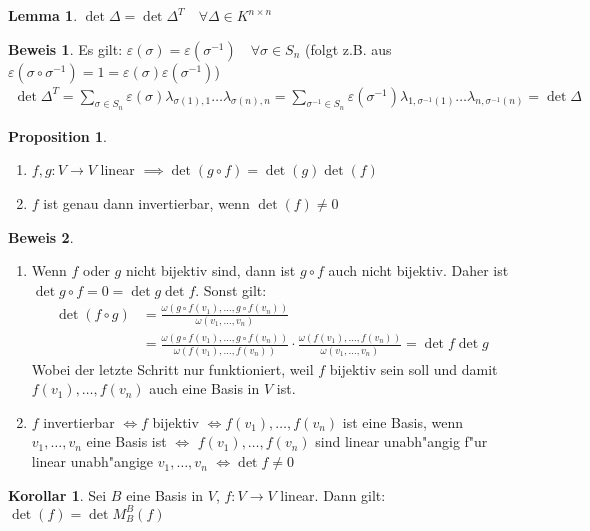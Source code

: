 \documentclass[oneside,fontsize=11pt,paper=a4,BCOR=0mm,DIV=12,automark,headsepline]{scrbook}
\theoremstyle{remark}
\theoremstyle{definition}
\newtheorem*{proposition}{Proposition}
\newtheorem{lemma}{Lemma}[section]
\newtheorem*{korollar}{Korollar}
\theoremstyle{definition}
\newtheorem*{prof}{Beweis}
\theoremstyle{remark}
\begin{document}
\begin{lemma}
	\(\det\Delta = \det\Delta^T\quad\forall \Delta\in K^{n\times n}\)
\end{lemma}
\begin{prof}
	Es gilt: \(\varepsilon(\sigma) = \varepsilon(\sigma^{-1})\quad\forall \sigma\in S_n \) (folgt z.B. aus \(\varepsilon(\sigma\circ\sigma^{-1})=1=\varepsilon(\sigma)\varepsilon(\sigma^{-1})\))
	\begin{align*}
	\det\Delta^T = \sum_{\sigma\in S_n}\varepsilon(\sigma)\lambda_{\sigma(1),1}\dots\lambda_{\sigma(n),n} = \sum_{\sigma^{-1}\in S_n}\varepsilon(\sigma^{-1})\lambda_{1,\sigma^{-1}(1)}\dots\lambda_{n,\sigma^{-1}(n)} = \det \Delta
	\end{align*}
\end{prof}
\begin{proposition}
	\begin{enumerate}
		\item \(f, g: V\to V \) linear \(\implies\det(g\circ f) = \det(g)\det(f) \)
		\item \(f\) ist genau dann invertierbar, wenn \(\det(f)\neq 0 \)
	\end{enumerate}
\end{proposition}
\begin{prof}
  \begin{enumerate}
  \item Wenn \(f\) oder \(g\) nicht bijektiv sind, dann ist \(g\circ f\) auch nicht bijektiv. Daher ist \(\det g\circ f = 0 = \det g \det f\). Sonst gilt:
    \begin{align*}
      \det (f\circ g) &= \frac{\omega (g\circ f(v_1), \dots, g\circ f(v_n))}{\omega (v_1, \dots, v_n)} \\
      &= \frac{\omega (g\circ f(v_1), \dots, g\circ f(v_n))}{\omega (f(v_1), \dots, f(v_n))}\cdot\frac{\omega (f(v_1), \dots, f(v_n))}{\omega (v_1,\dots ,v_n)} = \det f\det g
    \end{align*}
    Wobei der letzte Schritt nur funktioniert, weil \(f\) bijektiv sein soll und damit \(f(v_1), \dots ,f(v_n)\) auch eine Basis in \(V\) ist.
  \item \(f\) invertierbar \(\iff f\) bijektiv \(\iff f(v_1), \dots, f(v_n)\) ist eine Basis, wenn \(v_1, \dots, v_n\) eine Basis ist \(\iff\) \(f(v_1), \dots, f(v_n)\) sind linear unabh"angig f"ur linear unabh"angige \(v_1,\dots, v_n\) \(\iff \det f \neq 0\)
  \end{enumerate}
\end{prof}
\begin{korollar}
	Sei \(B\) eine Basis in \(V\), \(f:V\to V \) linear. Dann gilt: \(\det(f) = \det M^B_B(f) \)
\end{korollar}
\end{document}
